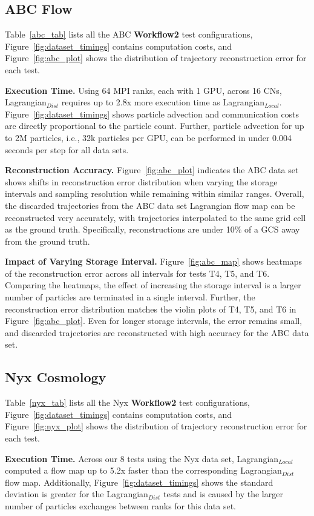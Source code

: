 \subsection{ABC Flow}
\label{sec:abc}

Table~\ref{abc_tab} lists all the ABC \textbf{Workflow2} test configurations, Figure~\ref{fig:dataset_timings} contains computation costs, and Figure~\ref{fig:abc_plot} shows the distribution of trajectory reconstruction error for each test.
%



\textbf{Execution Time.} Using 64 MPI ranks, each with 1 GPU, across 16 CNs, Lagrangian$_{Dist}$ requires up to 2.8x more execution time as Lagrangian$_{Local}$.
%
Figure~\ref{fig:dataset_timings} shows particle advection and communication costs are directly proportional to the particle count.
%
Further, particle advection for up to 2M particles, i.e., 32k particles per GPU, can be performed in under 0.004 seconds per step for all data sets.
%



\textbf{Reconstruction Accuracy.} Figure~\ref{fig:abc_plot} indicates the ABC data set shows shifts in reconstruction error distribution when varying the storage intervals and sampling resolution while remaining within similar ranges.
%
Overall, the discarded trajectories from the ABC data set Lagrangian flow map can be reconstructed very accurately, with trajectories interpolated to the same grid cell as the ground truth.
%
Specifically, reconstructions are under 10\% of a GCS away from the ground truth.
%

\textbf{Impact of Varying Storage Interval.} Figure~\ref{fig:abc_map} shows heatmaps of the reconstruction error across all intervals for tests T4, T5, and T6.
%
Comparing the heatmaps, the effect of increasing the storage interval is a larger number of particles are terminated in a single interval. 
%
Further, the reconstruction error distribution matches the violin plots of T4, T5, and T6 in Figure~\ref{fig:abc_plot}. 
%
Even for longer storage intervals, the error remains small, and discarded trajectories are reconstructed with high accuracy for the ABC data set.

\subsection{Nyx Cosmology}
\label{sec:nyx}
Table~\ref{nyx_tab} lists all the Nyx \textbf{Workflow2} test configurations, Figure~\ref{fig:dataset_timings} contains computation costs, and Figure~\ref{fig:nyx_plot} shows the distribution of trajectory reconstruction error for each test.
%

%
\textbf{Execution Time.} Across our 8 tests using the Nyx data set, Lagrangian$_{Local}$ computed a flow map up to 5.2x faster than the corresponding Lagrangian$_{Dist}$ flow map.
%
Additionally, Figure~\ref{fig:dataset_timings} shows the standard deviation is greater for the Lagrangian$_{Dist}$ tests and is caused by the larger number of particles exchanges between ranks for this data set.
%

